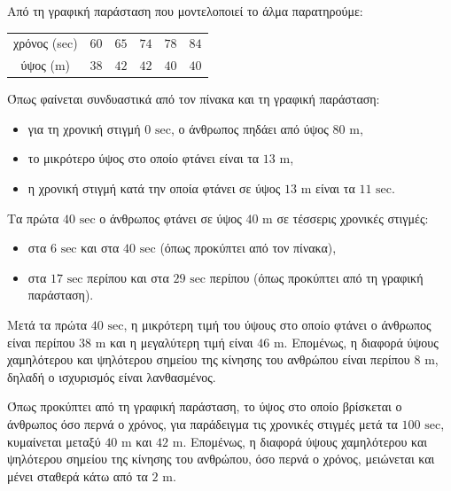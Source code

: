 
\begin{alist}
\item Από τη γραφική παράσταση που μοντελοποιεί το άλμα παρατηρούμε:

\begin{center}
\begin{tabular}{|c|c|c|c|c|c|}

χρόνος (sec) & $60$ & $65$ & $74$ & $78$ & $84$ \\ 
ύψος (m) & $38$ & $42$ & $42$ & $40$ & $40$ \\ 
\end{tabular}
\end{center}

\item Όπως φαίνεται συνδυαστικά από τον πίνακα και τη γραφική παράσταση:
\begin{itemize}
\item για τη χρονική στιγμή $0\text{ sec}$, ο άνθρωπος πηδάει από ύψος $80\text{ m}$,
\item το μικρότερο ύψος στο οποίο φτάνει είναι τα $13\text{ m}$,
\item η χρονική στιγμή κατά την οποία φτάνει σε ύψος $13\text{ m}$ είναι τα $11\text{ sec}$.
\end{itemize}

\item Τα πρώτα $40\text{ sec}$ ο άνθρωπος φτάνει σε ύψος $40\text{ m}$ σε τέσσερις χρονικές στιγμές:
\begin{itemize}
\item στα $6\text{ sec}$ και στα $40\text{ sec}$ (όπως προκύπτει από τον πίνακα),
\item στα $17\text{ sec}$ περίπου και στα $29\text{ sec}$ περίπου (όπως προκύπτει από τη γραφική παράσταση).
\end{itemize}

\item Μετά τα πρώτα $40\text{ sec}$, η μικρότερη τιμή του ύψους στο οποίο φτάνει ο άνθρωπος είναι περίπου $38\text{ m}$ και η μεγαλύτερη τιμή είναι $46\text{ m}$. Επομένως, η διαφορά ύψους χαμηλότερου και ψηλότερου σημείου της κίνησης του ανθρώπου είναι περίπου $8\text{ m}$, δηλαδή ο ισχυρισμός είναι λανθασμένος.

\item Όπως προκύπτει από τη γραφική παράσταση, το ύψος στο οποίο βρίσκεται ο άνθρωπος όσο περνά ο χρόνος, για παράδειγμα τις χρονικές στιγμές μετά τα $100\text{ sec}$, κυμαίνεται μεταξύ $40\text{ m}$ και $42\text{ m}$. Επομένως, η διαφορά ύψους χαμηλότερου και ψηλότερου σημείου της κίνησης του ανθρώπου, όσο περνά ο χρόνος, μειώνεται και μένει σταθερά κάτω από τα $2\text{ m}$.
\end{alist}

